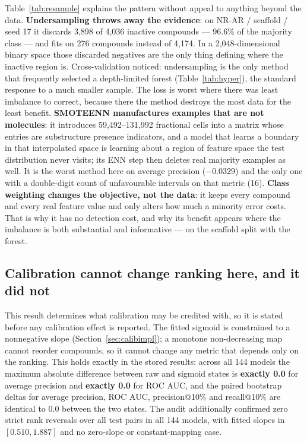 \documentclass[10pt,letterpaper]{article}
\begin{document}
Table~\ref{tab:resample} explains the pattern without appeal to anything beyond the data.
\textbf{Undersampling throws away the evidence}: on NR-AR / scaffold / seed 17 it discards 3{,}898 of
4{,}036 inactive compounds --- 96.6\% of the majority class --- and fits on 276 compounds instead of
4{,}174. In a 2{,}048-dimensional binary space those discarded negatives are the only thing defining
where the inactive region is. Cross-validation noticed: undersampling is the only method that
frequently selected a depth-limited forest (Table~\ref{tab:hyper}), the standard response to a much
smaller sample. The loss is worst where there was least imbalance to correct, because there the
method destroys the most data for the least benefit.
\textbf{SMOTEENN manufactures examples that are not molecules}: it introduces 59{,}492--131{,}992
fractional cells into a matrix whose entries are substructure presence indicators, and a model that
learns a boundary in that interpolated space is learning about a region of feature space the test
distribution never visits; its ENN step then deletes real majority examples as well. It is the worst
method here on average precision ($-0.0329$) and the only one with a double-digit count of
unfavourable intervals on that metric (16).
\textbf{Class weighting changes the objective, not the data}: it keeps every compound and every real
feature value and only alters how much a minority error costs. That is why it has no detection cost,
and why its benefit appears where the imbalance is both substantial and informative --- on the
scaffold split with the forest.

\subsection{Calibration cannot change ranking here, and it did not}
\label{sec:ranking}

This result determines what calibration may be credited with, so it is stated before any calibration
effect is reported. The fitted sigmoid is constrained to a nonnegative slope
(Section~\ref{sec:calibimpl}); a monotone non-decreasing map cannot reorder compounds, so it cannot
change any metric that depends only on the ranking. This holds exactly in the stored results: across
all 144 models the maximum absolute difference between raw and sigmoid states is \textbf{exactly 0.0}
for average precision and \textbf{exactly 0.0} for ROC AUC, and the paired bootstrap deltas for
average precision, ROC AUC, precision@10\% and recall@10\% are identical to 0.0 between the two
states. The audit additionally confirmed zero strict rank reversals over all test pairs in all 144
models, with fitted slopes in $[0.510, 1.887]$ and no zero-slope or constant-mapping case.
\end{document}

